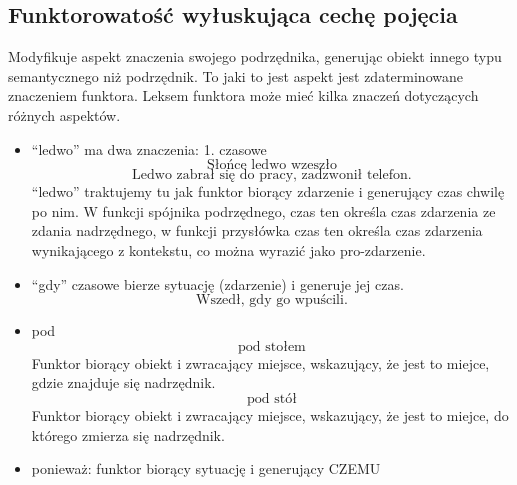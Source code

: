 \documentclass[a4paper, 12pt]{article}
\theoremstyle{remark}
\begin{document}
\subsection{Funktorowatość wyłuskująca cechę pojęcia}
Modyfikuje aspekt znaczenia swojego podrzędnika, generując obiekt innego typu semantycznego niż podrzędnik.
To jaki to jest aspekt jest zdaterminowane znaczeniem funktora.
Leksem funktora może mieć kilka znaczeń dotyczących różnych aspektów.
\begin{itemize}
\item ``ledwo'' ma dwa znaczenia:
1. czasowe
\begin{equation}
	\text{Słońce ledwo wzeszło}
\end{equation}
\begin{equation}
	\text{Ledwo zabrał się do pracy, zadzwonił telefon.}
\end{equation}
``ledwo'' traktujemy tu jak funktor biorący zdarzenie i generujący czas chwilę po nim. W funkcji 
spójnika podrzędnego, czas ten określa czas zdarzenia ze zdania nadrzędnego, w funkcji przysłówka 
czas ten określa czas zdarzenia wynikającego z kontekstu, co można wyrazić jako pro-zdarzenie.
\item ``gdy'' czasowe bierze sytuację (zdarzenie) i generuje jej czas.
\begin{equation}
	\text{Wszedł, gdy go wpuścili.}
\end{equation}

\item pod
\begin{equation}
	\text{pod stołem}
\end{equation}
Funktor biorący obiekt i zwracający miejsce, wskazujący, że jest to miejce, gdzie znajduje się nadrzędnik.
\begin{equation}
	\text{pod stół}
\end{equation}
Funktor biorący obiekt i zwracający miejsce, wskazujący, że jest to miejce, do którego zmierza się nadrzędnik.
\item ponieważ: funktor biorący sytuację i generujący CZEMU

\end{itemize}
\end{document}
